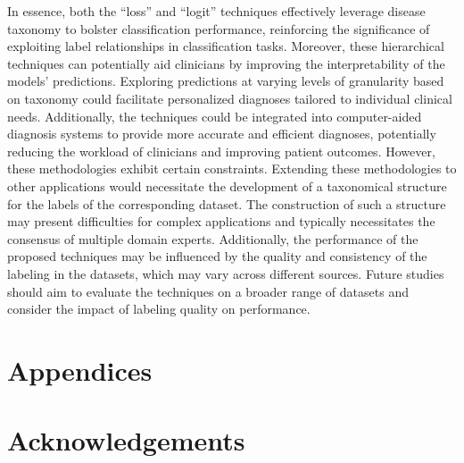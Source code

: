 In essence, both the ``loss'' and ``logit'' techniques effectively leverage disease taxonomy to bolster classification performance, reinforcing the significance of exploiting label relationships in classification tasks. Moreover, these hierarchical techniques can potentially aid clinicians by improving the interpretability of the models' predictions. Exploring predictions at varying levels of granularity based on taxonomy could facilitate personalized diagnoses tailored to individual clinical needs.  Additionally, the techniques could be integrated into computer-aided diagnosis systems to provide more accurate and efficient diagnoses, potentially reducing the workload of clinicians and improving patient outcomes.
However, these methodologies exhibit certain constraints. Extending these methodologies to other applications would necessitate the development of a taxonomical structure for the labels of the corresponding dataset. The construction of such a structure may present difficulties for complex applications and typically necessitates the consensus of multiple domain experts. Additionally, the performance of the proposed techniques may be influenced by the quality and consistency of the labeling in the datasets, which may vary across different sources. Future studies should aim to evaluate the techniques on a broader range of datasets and consider the impact of labeling quality on performance.
\section*{Appendices}
\section*{Acknowledgements}
